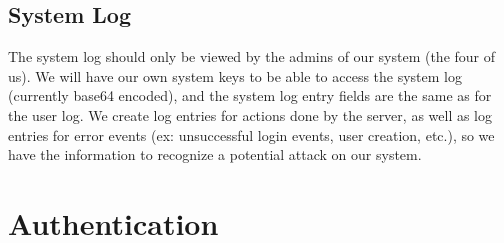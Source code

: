 \documentclass{article}
\begin{document}

\subsection{System Log}
The system log should only be viewed by the admins of our system (the four of us). We will have our own system keys to be able to access the system log (currently base64 encoded), and the system log entry fields are the same as for the user log. We create log entries for actions done by the server, as well as log entries for error events (ex: unsuccessful login events, user creation, etc.), so we have the information to recognize a potential attack on our system.

\section{Authentication}
\end{document}
